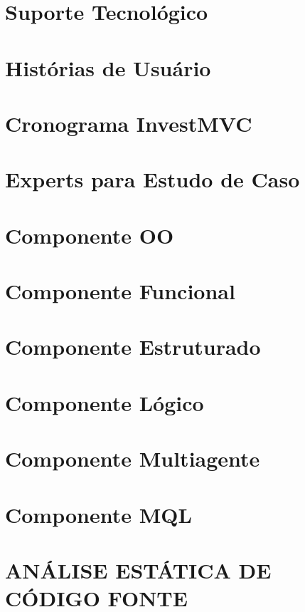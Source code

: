 \begin{apendicesenv}

\partapendices

\chapter{Suporte Tecnológico}


\chapter{Histórias de Usuário}


\chapter{Cronograma InvestMVC}


\chapter{Experts para Estudo de Caso}


\chapter{Componente OO}



\chapter{Componente Funcional}



\chapter{Componente Estruturado}


\chapter{Componente Lógico}



\chapter{Componente Multiagente}


\chapter{Componente MQL}


\chapter{ANÁLISE ESTÁTICA DE CÓDIGO FONTE}


\end{apendicesenv}
